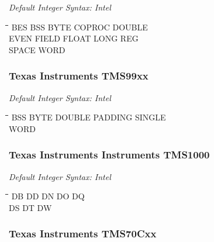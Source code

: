 {\em Default Integer Syntax: Intel}

{\tt\begin{tabbing}
\hspace{3cm}\=\hspace{3cm}\=\hspace{3cm}\=\hspace{3cm}\=\kill
BES        \> BSS         \> BYTE        \> COPROC      \> DOUBLE \\
EVEN       \> FIELD       \> FLOAT       \> LONG        \> REG \\
SPACE      \> WORD \\
\end{tabbing}}

\subsubsection{Texas Instruments TMS99xx}

{\em Default Integer Syntax: Intel}

{\tt\begin{tabbing}
\hspace{3cm}\=\hspace{3cm}\=\hspace{3cm}\=\hspace{3cm}\=\kill
BSS        \> BYTE        \> DOUBLE      \> PADDING     \> SINGLE \\
WORD \\
\end{tabbing}}

\subsubsection{Texas Instruments Instruments TMS1000}

{\em Default Integer Syntax: Intel}

{\tt\begin{tabbing}
\hspace{3cm}\=\hspace{3cm}\=\hspace{3cm}\=\hspace{3cm}\=\kill
DB         \> DD          \> DN          \> DO         \> DQ \\
DS         \> DT          \> DW \\
\end{tabbing}}

\subsubsection{Texas Instruments TMS70Cxx}

